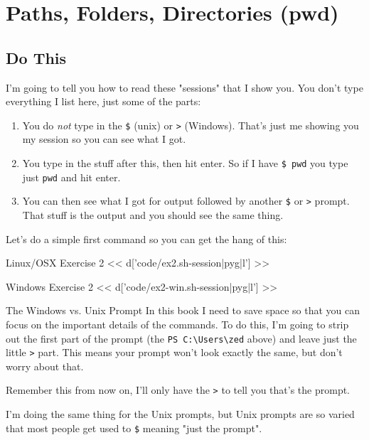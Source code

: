 \chapter{Paths, Folders, Directories (pwd)}

\section{Do This}

I'm going to tell you how to read these "sessions" that I show you.  You don't
type everything I list here, just some of the parts:

\begin{enumerate} 
\item You do \emph{not} type in the \verb|$| (unix) or
    \verb|>| (Windows).  That's just me showing you my session so you can see what
    I got.
\item You type in the stuff after this, then hit enter.  So if I have \verb|$ pwd| you type just \verb|pwd| and hit enter.
\item You can then see what I got for output followed by another \verb|$| or \verb|>| prompt.  That stuff is the output and you should see the same thing.
\end{enumerate}

Let's do a simple first command so you can get the hang of this:

\begin{code}{Linux/OSX Exercise 2}
<< d['code/ex2.sh-session|pyg|l'] >>
\end{code}

\begin{code}{Windows Exercise 2}
<< d['code/ex2-win.sh-session|pyg|l'] >>
\end{code}

\begin{aside}{The Windows vs. Unix Prompt}
In this book I need to save space so that you can focus on the important
details of the commands.  To do this, I'm going to strip out the 
first part of the prompt (the \verb|PS C:\Users\zed| above) and leave
just the little \verb|>| part.  This means your prompt won't look
exactly the same, but don't worry about that.

Remember this from now on, I'll only have the \verb|>| to tell you
that's the prompt.

I'm doing the same thing for the Unix prompts, but Unix prompts are so
varied that most people get used to \verb|$| meaning "just the prompt".
\end{aside}

